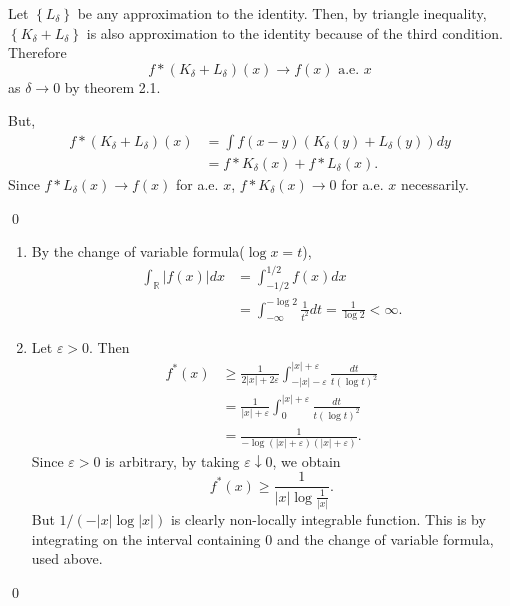 \begin{exercise}[3.2] \hfill

	Let $\left\{ L_\delta \right\}$ be any approximation to the identity.
	Then, by triangle inequality, $\left\{ K_\delta + L_\delta \right\}$ is also approximation to the identity because of the third condition.
	Therefore
	\[
		f*\left( K_\delta + L_\delta \right)(x) \rightarrow f(x) \text{ a.e. }x
	\]
	as $\delta \rightarrow 0$ by theorem 2.1.
	
	But,
	\[
		\begin{split}
			f*(K_\delta +L_\delta)(x)
			&= \int f(x-y)(K_\delta(y) + L_\delta(y)) dy \\
			&= f*K_\delta(x) + f*L_\delta(x).
		\end{split}
	\]
	Since $f*L_\delta(x) \rightarrow f(x)$ for a.e. $x$,
	$f*K_\delta(x) \rightarrow 0$ for a.e. $x$ necessarily.

	\qed
\end{exercise}

\begin{exercise}[3.5] \hfill
	\begin{enumerate}[label = (\alph*)]
		\item By the change of variable formula($\log x = t$),
			\[
				\begin{split}
					\int_\mathbb{R} |f(x)| dx
					&= \int_{-1/2}^{1/2}f(x) dx \\
					&= \int_{-\infty}^{-\log 2}\frac{1}{t^2}dt = \frac{1}{\log 2} < \infty.
				\end{split}
			\]

		\item Let $\varepsilon > 0$.
			Then
			\[
				\begin{split}
					f^*(x) &\ge \frac{1}{2|x| + 2\varepsilon}\int_{-|x|-\varepsilon}^{|x|+\varepsilon} \frac{dt}{t (\log t)^2} \\
					&= \frac{1}{|x|+\varepsilon}\int_0^{|x|+\varepsilon}\frac{dt}{t(\log t)^2} \\
					&= \frac{1}{-\log\left( |x|+\varepsilon \right)(|x|+\varepsilon)}.
				\end{split}
			\]
			Since $\varepsilon>0$ is arbitrary, by taking $\varepsilon \downarrow 0$, we obtain
			\[
				f^*(x) \ge \frac{1}{|x|\log \frac{1}{|x|}}.
			\]
			But $1/(-|x| \log|x|)$ is clearly non-locally integrable function.
			This is by integrating on the interval containing $0$ and the change of variable formula, used above.
	\end{enumerate}

	\qed
\end{exercise}

